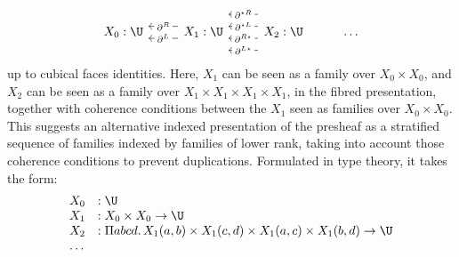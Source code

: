 \documentclass{msc}
\newcommand{\kstar}{{\star}}
\begin{document}
\begin{equation*}
  \begin{tikzcd}
    X_0: \U & X_1: \U \arrow[l, "\partial^L" description, shift left=2] \arrow[l, "\partial^R" description, shift right=2] & X_2: \U \arrow[l, "\partial^{L\kstar}" description, shift left=6] \arrow[l, "\partial^{R\kstar}" description, shift left=2] \arrow[l, "\partial^{\kstar L}" description, shift right=2] \arrow[l, "\partial^{\kstar R}" description, shift right=6] & \ldots
  \end{tikzcd}
\end{equation*}
up to cubical faces identities. Here, $X_1$ can be seen as a family over $X_0 \times X_0$, and $X_2$ can be seen as a family over $X_1 \times X_1 \times X_1 \times X_1$, in the fibred presentation, together with coherence conditions between the $X_1$ seen as families over $X_0 \times X_0$. This suggests an alternative indexed presentation of the presheaf as a stratified sequence of families indexed by families of lower rank, taking into account those coherence conditions to prevent duplications. Formulated in type theory, it takes the form:
\begin{equation*}
  \begin{array}{lll}
    X_0 & :               \U                                                                        \\
    X_1 & :               X_0 \times X_0 \rightarrow  \U                                            \\
    X_2 & : \Pi a b c d.\,  X_1(a,b) \times X_1 (c,d) \times X_1(a,c) \times X_1 (b,d) \rightarrow \U \\
    \ldots
  \end{array}
\end{equation*}
\end{document}
